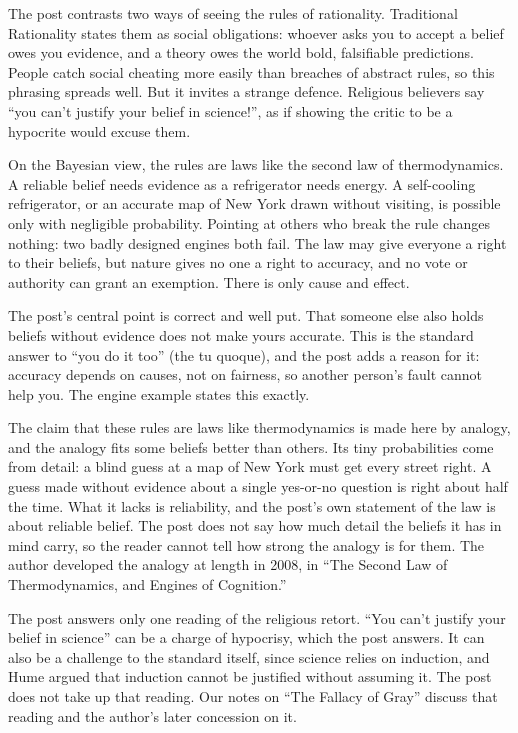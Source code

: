 \begin{afterword}
\summaryhead

The post contrasts two ways of seeing the rules of rationality. Traditional Rationality states them as social obligations: whoever asks you to accept a belief owes you evidence, and a theory owes the world bold, falsifiable predictions. People catch social cheating more easily than breaches of abstract rules, so this phrasing spreads well. But it invites a strange defence. Religious believers say ``you can't justify your belief in science!'', as if showing the critic to be a hypocrite would excuse them.

On the Bayesian view, the rules are laws like the second law of thermodynamics. A reliable belief needs evidence as a refrigerator needs energy. A self-cooling refrigerator, or an accurate map of New York drawn without visiting, is possible only with negligible probability. Pointing at others who break the rule changes nothing: two badly designed engines both fail. The law may give everyone a right to their beliefs, but nature gives no one a right to accuracy, and no vote or authority can grant an exemption. There is only cause and effect.

\responsehead

The post's central point is correct and well put. That someone else also holds beliefs without evidence does not make yours accurate. This is the standard answer to ``you do it too'' (the tu quoque), and the post adds a reason for it: accuracy depends on causes, not on fairness, so another person's fault cannot help you. The engine example states this exactly.

The claim that these rules are laws like thermodynamics is made here by analogy, and the analogy fits some beliefs better than others. Its tiny probabilities come from detail: a blind guess at a map of New York must get every street right. A guess made without evidence about a single yes-or-no question is right about half the time. What it lacks is reliability, and the post's own statement of the law is about reliable belief. The post does not say how much detail the beliefs it has in mind carry, so the reader cannot tell how strong the analogy is for them. The author developed the analogy at length in 2008, in ``The Second Law of Thermodynamics, and Engines of Cognition.''

The post answers only one reading of the religious retort. ``You can't justify your belief in science'' can be a charge of hypocrisy, which the post answers. It can also be a challenge to the standard itself, since science relies on induction, and Hume argued that induction cannot be justified without assuming it. The post does not take up that reading. Our notes on ``The Fallacy of Gray'' discuss that reading and the author's later concession on it.


\end{afterword}
